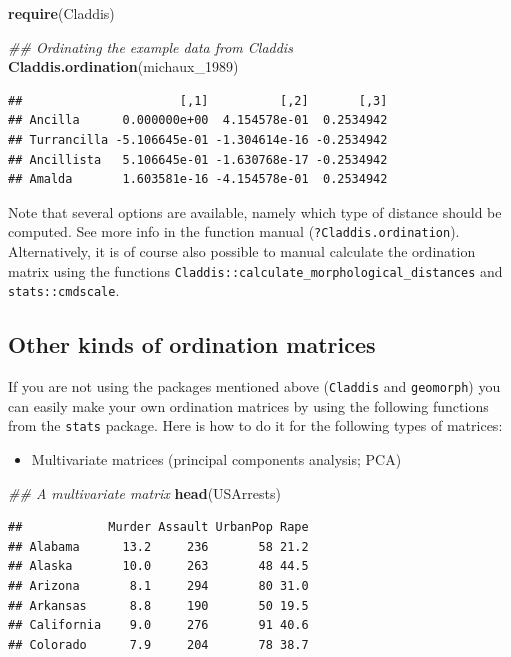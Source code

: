 \documentclass[
]{book}
\newenvironment{Shaded}{\begin{snugshade}}{\end{snugshade}}
\newcommand{\CommentTok}[1]{\textcolor[rgb]{0.56,0.35,0.01}{\textit{#1}}}
\newcommand{\DecValTok}[1]{\textcolor[rgb]{0.00,0.00,0.81}{#1}}
\newcommand{\KeywordTok}[1]{\textcolor[rgb]{0.13,0.29,0.53}{\textbf{#1}}}
\newcommand{\NormalTok}[1]{#1}
\providecommand{\tightlist}{%
  \setlength{\itemsep}{0pt}\setlength{\parskip}{0pt}}
\begin{document}
\begin{Shaded}
\begin{Highlighting}[]
\KeywordTok{require}\NormalTok{(Claddis)}

\CommentTok{\#\# Ordinating the example data from Claddis}
\KeywordTok{Claddis.ordination}\NormalTok{(michaux\_}\DecValTok{1989}\NormalTok{)}
\end{Highlighting}
\end{Shaded}

\begin{verbatim}
##                      [,1]          [,2]       [,3]
## Ancilla      0.000000e+00  4.154578e-01  0.2534942
## Turrancilla -5.106645e-01 -1.304614e-16 -0.2534942
## Ancillista   5.106645e-01 -1.630768e-17 -0.2534942
## Amalda       1.603581e-16 -4.154578e-01  0.2534942
\end{verbatim}

Note that several options are available, namely which type of distance should be computed.
See more info in the function manual (\texttt{?Claddis.ordination}).
Alternatively, it is of course also possible to manual calculate the ordination matrix using the functions \texttt{Claddis::calculate\_morphological\_distances} and \texttt{stats::cmdscale}.

\hypertarget{other-kinds-of-ordination-matrices}{%
\subsection{Other kinds of ordination matrices}\label{other-kinds-of-ordination-matrices}}

If you are not using the packages mentioned above (\texttt{Claddis} and \texttt{geomorph}) you can easily make your own ordination matrices by using the following functions from the \texttt{stats} package.
Here is how to do it for the following types of matrices:

\begin{itemize}
\tightlist
\item
  Multivariate matrices (principal components analysis; PCA)
\end{itemize}

\begin{Shaded}
\begin{Highlighting}[]
\CommentTok{\#\# A multivariate matrix}
\KeywordTok{head}\NormalTok{(USArrests)}
\end{Highlighting}
\end{Shaded}

\begin{verbatim}
##            Murder Assault UrbanPop Rape
## Alabama      13.2     236       58 21.2
## Alaska       10.0     263       48 44.5
## Arizona       8.1     294       80 31.0
## Arkansas      8.8     190       50 19.5
## California    9.0     276       91 40.6
## Colorado      7.9     204       78 38.7
\end{verbatim}
\end{document}
